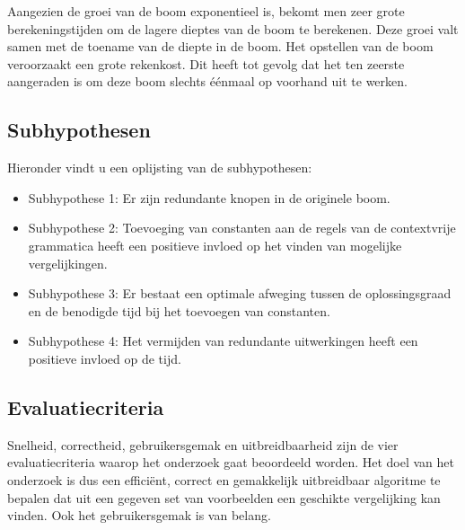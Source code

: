 \documentclass[Main.tex]{subfiles}
\begin{document}
Aangezien de groei van de boom exponentieel is, bekomt men zeer grote berekeningstijden om de lagere dieptes van de boom te berekenen. Deze groei valt samen met de toename van de diepte in de boom. Het opstellen van de boom veroorzaakt een grote rekenkost. Dit heeft tot gevolg dat het ten zeerste aangeraden is om deze boom slechts \'e\'enmaal op voorhand uit te werken.

\subsection{Subhypothesen} \label{ssec:subhypothesen}
\par Hieronder vindt u een oplijsting van de subhypothesen:

\begin{itemize}
\item Subhypothese 1: Er zijn redundante knopen in de originele boom.
\item Subhypothese 2: Toevoeging van constanten aan de regels van de contextvrije grammatica heeft een positieve invloed op het vinden van mogelijke vergelijkingen.
\item Subhypothese 3: Er bestaat een optimale afweging tussen de oplossingsgraad en de benodigde tijd bij het toevoegen van constanten.
\item Subhypothese 4: Het vermijden van redundante uitwerkingen heeft een positieve invloed op de tijd. 
\end{itemize}

\subsection{Evaluatiecriteria}

Snelheid, correctheid, gebruikersgemak en uitbreidbaarheid zijn de vier evaluatiecriteria waarop het onderzoek gaat beoordeeld worden. Het doel van het onderzoek is dus een effici\"ent, correct en gemakkelijk uitbreidbaar algoritme te bepalen dat uit een gegeven set van voorbeelden een geschikte vergelijking kan vinden. Ook het gebruikersgemak is van belang.
\end{document}
